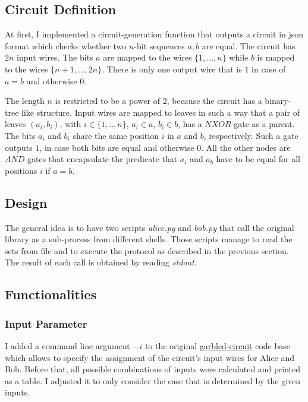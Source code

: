 \documentclass[a4paper,12pt]{scrartcl}
\begin{document}
\subsection{Circuit Definition}

At first, I implemented a circuit-generation function that outputs a circuit in json format which checks whether two $n$-bit sequences $a,b$ are equal. The circuit has $2n$ input wires. The bits $a$ are mapped to the wires $\{1,...,n\}$ while $b$ is mapped to the wires $\{n+1,...,2n\}$. There is only one output wire that is $1$ in case of $a=b$ and otherwise $0$. 

The length $n$ is restricted to be a power of 2, because the circuit has a binary-tree like structure. Input wires are mapped to leaves in such a way that a pair of leaves $(a_i, b_i)$, with $ i \in \{1,..,n\}$, $a_i \in a$, $b_i \in b $, has a $NXOR$-gate as a parent. The bits $a_i$ and $b_i$ share the same position $i$ in $a$ and $b$, respectively. Such a gate outputs $1$, in case both bits are equal and otherwise $0$. All the other nodes are $AND$-gates that encapsulate the predicate that $a_i$ and $a_b$ have to be equal for all positions $i$ if $a=b$. 


\subsection{Design}

The general idea is to have two scripts \textit{alice.py} and \textit{bob.py} that call the original library as a sub-process from different shells. Those scripts manage to read the sets from file and to execute the protocol as described in the previous section. The result of each call is obtained by reading \textit{stdout}. 

\subsection{Functionalities}


\subsubsection{Input Parameter}

I added a command line argument $-i$ to the original \href{https://github.com/ojroques/garbled-circuit}{garbled-circuit} code base which allows to specify the assignment of the circuit's input wires for Alice and Bob. Before that, all possible combinations of inputs were calculated and printed as a table. I adjusted it to only consider the case that is determined by the given inputs. 
\end{document}

